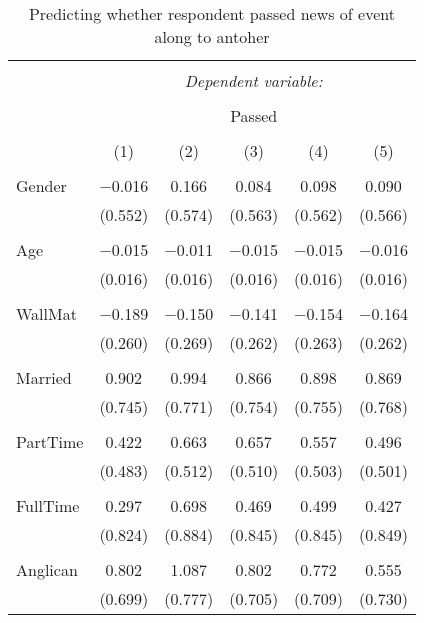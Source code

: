 
\begin{table}[!htbp] \centering 
  \caption{Predicting whether respondent passed news of event along to antoher} 
  \label{} 
\footnotesize 
\begin{tabular}{@{\extracolsep{5pt}}lccccc} 
\\[-1.8ex]\hline 
\hline \\[-1.8ex] 
 & \multicolumn{5}{c}{\textit{Dependent variable:}} \\ 
\cline{2-6} 
\\[-1.8ex] & \multicolumn{5}{c}{Passed} \\ 
\\[-1.8ex] & (1) & (2) & (3) & (4) & (5)\\ 
\hline \\[-1.8ex] 
 Gender & $-$0.016 & 0.166 & 0.084 & 0.098 & 0.090 \\ 
  & (0.552) & (0.574) & (0.563) & (0.562) & (0.566) \\ 
  & & & & & \\ 
 Age & $-$0.015 & $-$0.011 & $-$0.015 & $-$0.015 & $-$0.016 \\ 
  & (0.016) & (0.016) & (0.016) & (0.016) & (0.016) \\ 
  & & & & & \\ 
 WallMat & $-$0.189 & $-$0.150 & $-$0.141 & $-$0.154 & $-$0.164 \\ 
  & (0.260) & (0.269) & (0.262) & (0.263) & (0.262) \\ 
  & & & & & \\ 
 Married & 0.902 & 0.994 & 0.866 & 0.898 & 0.869 \\ 
  & (0.745) & (0.771) & (0.754) & (0.755) & (0.768) \\ 
  & & & & & \\ 
 PartTime & 0.422 & 0.663 & 0.657 & 0.557 & 0.496 \\ 
  & (0.483) & (0.512) & (0.510) & (0.503) & (0.501) \\ 
  & & & & & \\ 
 FullTime & 0.297 & 0.698 & 0.469 & 0.499 & 0.427 \\ 
  & (0.824) & (0.884) & (0.845) & (0.845) & (0.849) \\ 
  & & & & & \\ 
 Anglican & 0.802 & 1.087 & 0.802 & 0.772 & 0.555 \\ 
  & (0.699) & (0.777) & (0.705) & (0.709) & (0.730) \\ 

\end{tabular}
\end{table}
